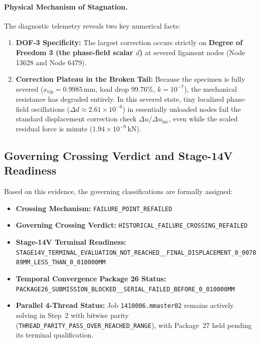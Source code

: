 \paragraph{Physical Mechanism of Stagnation.}
The diagnostic telemetry reveals two key numerical facts:
\begin{enumerate}
  \item \textbf{DOF-3 Specificity:} The largest correction occurs strictly on \textbf{Degree of Freedom 3 (the phase-field scalar $d$)} at severed ligament nodes (Node 13628 and Node 6479).
  \item \textbf{Correction Plateau in the Broken Tail:} Because the specimen is fully severed ($x_{\mathrm{tip}} = 0.9985\,\mathrm{mm}$, load drop $99.76\%$, $k=10^{-7}$), the mechanical resistance has degraded entirely. In this severed state, tiny localized phase-field oscillations ($\Delta d \approx 2.61\times 10^{-6}$) in essentially unloaded nodes fail the standard displacement correction check $\Delta u / \Delta u_{\text{inc}}$, even while the scaled residual force is minute ($1.94\times 10^{-9}\,\mathrm{kN}$).
\end{enumerate}

\subsection{Governing Crossing Verdict and Stage-14V Readiness}
\label{subsec:stage14uaf_verdict}

Based on this evidence, the governing classifications are formally assigned:
\begin{itemize}
  \item \textbf{Crossing Mechanism:} \texttt{FAILURE\_POINT\_REFAILED}
  \item \textbf{Governing Crossing Verdict:} \texttt{HISTORICAL\_FAILURE\_CROSSING\_REFAILED}
  \item \textbf{Stage-14V Terminal Readiness:} \texttt{STAGE14V\_TERMINAL\_EVALUATION\_NOT\_REACHED\_\_FINAL\_DISPLACEMENT\_0\_007889MM\_LESS\_THAN\_0\_010000MM}
  \item \textbf{Temporal Convergence Package 26 Status:} \texttt{PACKAGE26\_SUBMISSION\_BLOCKED\_\_SERIAL\_FAILED\_BEFORE\_0\_010000MM}
  \item \textbf{Parallel 4-Thread Status:} Job \texttt{1410006.mmaster02} remains actively solving in Step~2 with bitwise parity (\texttt{THREAD\_PARITY\_PASS\_OVER\_REACHED\_RANGE}), with Package~27 held pending its terminal qualification.
\end{itemize}

